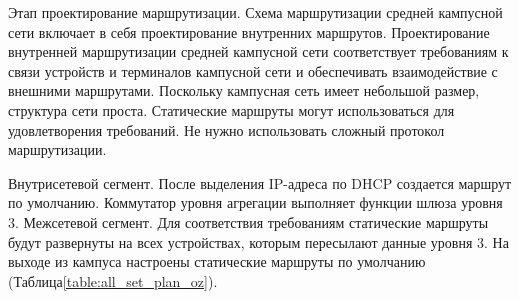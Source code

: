 

Этап проектирование маршрутизации. Схема маршрутизации средней кампусной сети включает в себя проектирование внутренних маршрутов. Проектирование внутренней маршрутизации средней кампусной сети соответствует требованиям к связи устройств и терминалов кампусной сети и обеспечивать взаимодействие с внешними маршрутами. Поскольку кампусная сеть имеет небольшой размер, структура сети проста. Статические маршруты могут использоваться для удовлетворения требований. Не нужно использовать сложный протокол маршрутизации. 

Внутрисетевой сегмент. После выделения IP-адреса по DHCP создается маршрут по умолчанию\cite{habr-routing}. Коммутатор уровня агрегации выполняет функции шлюза уровня 3. Межсетевой сегмент. Для соответствия требованиям статические маршруты будут развернуты на всех устройствах, которым пересылают данные уровня 3. На выходе из кампуса настроены статические маршруты по умолчанию (Таблица\;\ref{table:all_set_plan_oz}).


